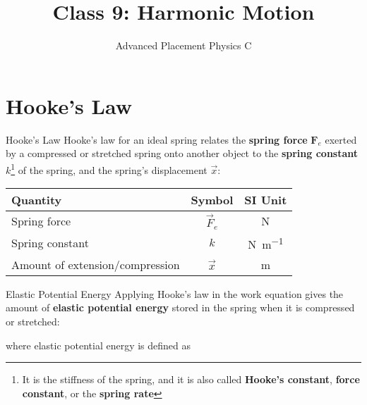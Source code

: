 \documentclass[12pt,compress,aspectratio=169]{beamer}
\title{Class 9: Harmonic Motion}
\subtitle{Advanced Placement Physics C}
\begin{document}
\begin{frame}
  \maketitle
\end{frame}


\section{Hooke's Law}

\begin{frame}{Hooke's Law}
  Hooke's law for an ideal spring relates the \textbf{spring force} $\bm F_e$
  exerted by a compressed or stretched spring onto another object to the
  \textbf{spring constant} $k$\footnote{It is the stiffness of the spring,
    and it is also called \textbf{Hooke's constant}, \textbf{force constant},
    or the \textbf{spring rate}} of the spring, and the spring's displacement
  $\vec x$:

  \begin{center}
    \begin{tabular}{l|c|c}
      \rowcolor{pink}
      \textbf{Quantity} & \textbf{Symbol} & \textbf{SI Unit} \\ \hline
      Spring force                    & $\vec F_e$ & \si\newton \\
      Spring constant                 & $k$        & \si{\newton\per\metre}\\
      Amount of extension/compression & $\vec x$   & \si\metre
    \end{tabular}
  \end{center}
\end{frame}



\begin{frame}{Elastic Potential Energy}
  Applying Hooke's law in the work equation gives the amount of 
  \textbf{elastic potential energy} stored in the spring when it is
  compressed or stretched:


  where elastic potential energy is defined as

\end{frame}
\end{document}
